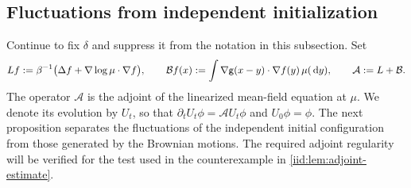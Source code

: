 \documentclass[11pt,reqno]{amsart}
\numberwithin{equation}{section}
\theoremstyle{plain}
\theoremstyle{remark}
\begin{document}
\subsection{Fluctuations from independent initialization}\label{iid:subsec:fluctuations}
Continue to fix $\delta$ and suppress it from the notation in this subsection. Set
\begin{equation}\label{iid:eq:linear-operators}
 Lf:=\beta^{-1}\bigl(\Delta f+\nabla\log\mu\cdot\nabla f\bigr),\qquad
 \mathcal Bf(x):=\int\nabla\mathsf g(x-y)\cdot\nabla f(y)\,\mu(\,\mathrm d y),\qquad
 \mathcal A:=L+\mathcal B.
\end{equation}
The operator $\mathcal A$ is the adjoint of the linearized mean-field equation at $\mu$. We denote its evolution by $U_t$, so that $\partial_tU_t\phi=\mathcal A U_t\phi$ and $U_0\phi=\phi$. The next proposition separates the fluctuations of the independent initial configuration from those generated by the Brownian motions. The required adjoint regularity will be verified for the test used in the counterexample in \cref{iid:lem:adjoint-estimate}.
\end{document}
